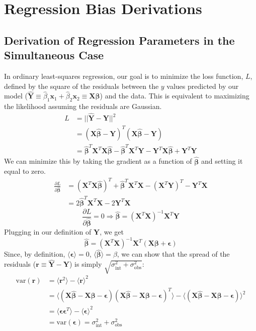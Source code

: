 \chapter{Regression Bias Derivations}
\section{Derivation of Regression Parameters in the Simultaneous Case}
\label{app:simultaneous_ols}
In ordinary least-squares regression, our goal is to minimize the loss function, $L$, defined by the square of the residuals between the $y$ values predicted by our model ($\hat{\bm{Y}}\equiv\hat{\beta}_1\bm{x}_1 +\hat{\beta}_2\bm{x}_2\equiv\bm{X\hat{\beta}}$) and the data. This is equivalent to maximizing the likelihood assuming the residuals are Gaussian.
\begin{align*}
    L &= ||\hat{\bm{Y}}-\bm{Y}||^2\\
    &= (\bm{X\hat{\beta}}-\bm{Y})^T(\bm{X\hat{\beta}}-\bm{Y})\\
    &= \bm{\hat{\beta}}^T\bm{X}^T\bm{X\hat{\beta}}
    - \bm{\hat{\beta}}^T\bm{X}^T\bm{Y}
    - \bm{Y}^T\bm{X\hat{\beta}}
    + \bm{Y}^T\bm{Y}
\end{align*}
We can minimize this by taking the gradient as a function of $\bm{\hat{\beta}}$ and setting it equal to zero.
\begin{align*}
    \frac{\partial L}{\partial\bm{\hat{\beta}}} &=
    (\bm{X}^T\bm{X}\bm{\hat{\beta}})^T
    + \bm{\hat{\beta}}^T\bm{X}^T\bm{X}
    - (\bm{X}^T\bm{Y})^T
    - \bm{Y}^T\bm{X}\\
    &= 2\bm{\hat{\beta}}^T\bm{X}^T\bm{X} - 2\bm{Y}^T\bm{X}
\end{align*}
$$\frac{\partial L}{\partial\bm{\hat{\beta}}} = 0 \Rightarrow \bm{\hat{\beta}}=(\bm{X}^T\bm{X})^{-1}\bm{X}^T\bm{Y}$$
Plugging in our definition of $\bm{Y}$, we get
\begin{equation}
    \bm{\hat{\beta}} = (\bm{X}^T\bm{X})^{-1}\bm{X}^T(\bm{X\beta} + \bm{\epsilon})
\label{eqn:sim_beta_vec_app}
\end{equation}
Since, by definition, $\langle\bm{\epsilon}\rangle=0$, $\langle\bm{\hat{\beta}}\rangle = \beta$, we can show that the spread of the residuals ($\bm{r}\equiv\bm{\hat{Y}}-\bm{Y}$) is simply $\sqrt{\sigma_\text{int}^2 + \sigma_\text{obs}^2}$:
\begin{align*}
    \text{var}(\bm{r}) &= \langle\bm{r}^2\rangle - \langle\bm{r}\rangle^2\\
    &= \langle(\bm{X\hat{\beta}}-\bm{X\beta}-\bm{\epsilon})(\bm{X\hat{\beta}}-\bm{X\beta}-\bm{\epsilon})^T\rangle - \langle(\bm{X\hat{\beta}}-\bm{X\beta}-\bm{\epsilon})\rangle^2\\
    &= \langle\bm{\epsilon}\bm{\epsilon}^T\rangle - \langle\bm{\epsilon}\rangle^2\\
    &= \text{var}(\bm{\epsilon}) = \sigma_\text{int}^2 + \sigma_\text{obs}^2
\end{align*}


